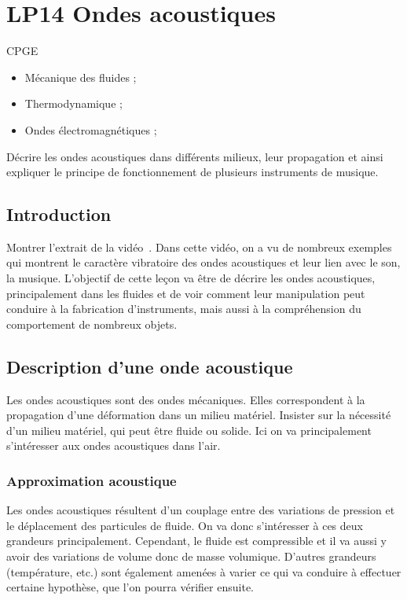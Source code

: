 \section{LP14 Ondes acoustiques}

\niveau CPGE

\prerequis
\begin{itemize}
\item Mécanique des fluides ;
\item Thermodynamique ;
\item Ondes électromagnétiques ;
\end{itemize}

\objectif Décrire les ondes acoustiques dans différents milieux, leur propagation et ainsi expliquer le principe de fonctionnement de plusieurs instruments de musique. 

\footnotesize{}

\subsection{Introduction}

Montrer l'extrait de la vidéo~\cite{Stanford2014}.
Dans cette vidéo, on a vu de nombreux exemples qui montrent le caractère vibratoire des ondes acoustiques et leur lien avec le son, la musique.
L'objectif de cette leçon va être de décrire les ondes acoustiques, principalement dans les fluides et de voir comment leur manipulation peut conduire à la fabrication d'instruments, mais aussi à la compréhension du comportement de nombreux objets.

\subsection{Description d'une onde acoustique}

Les ondes acoustiques sont des ondes mécaniques.
Elles correspondent à la propagation d'une déformation dans un milieu matériel.
Insister sur la nécessité d'un milieu matériel, qui peut être fluide ou solide.
Ici on va principalement s'intéresser aux ondes acoustiques dans l'air.

\subsubsection{Approximation acoustique}

Les ondes acoustiques résultent d'un couplage entre des variations de pression et le déplacement des particules de fluide.
On va donc s'intéresser à ces deux grandeurs principalement.
Cependant, le fluide est compressible et il va aussi y avoir des variations de volume donc de masse volumique.
D'autres grandeurs (température, etc.) sont également amenées à varier ce qui va conduire à effectuer certaine hypothèse, que l'on pourra vérifier ensuite.

